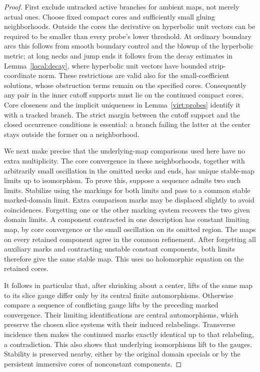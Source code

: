 \documentclass[11pt]{article}
\theoremstyle{definition}
\theoremstyle{remark}
\numberwithin{equation}{section}
\begin{document}
\begin{proof}
First exclude untracked active branches for ambient maps, not merely
actual ones.  Choose fixed compact cores and sufficiently small gluing
neighborhoods.  Outside the cores the derivative on hyperbolic unit
vectors can be required to be smaller than every probe's lower
threshold.  At ordinary boundary arcs this follows from smooth boundary
control and the blowup of the hyperbolic metric; at long necks and jump
ends it follows from the decay estimates in Lemma~\ref{local:decay},
where hyperbolic unit vectors have bounded strip-coordinate norm.
These restrictions are valid also for the small-coefficient solutions,
whose obstruction terms remain on the specified cores.  Consequently
any pair in the inner cutoff supports must lie on the continued compact
cores.  Core closeness and the implicit uniqueness in
Lemma~\ref{virt:probes} identify it with a tracked branch.  The strict
margin between the cutoff support and the closed occurrence conditions
is essential: a branch failing the latter at the center stays outside
the former on a neighborhood.

We next make precise that the underlying-map comparisons used here have
no extra multiplicity.  The core convergence in these neighborhoods,
together with arbitrarily small oscillation in the omitted necks and
ends, has unique stable-map limits up to isomorphism.  To prove this,
suppose a sequence admits two such limits.  Stabilize using the markings
for both limits and pass to a common stable marked-domain limit.  Extra
comparison marks may be displaced slightly to avoid coincidences.
Forgetting one or the other marking system recovers the two given domain
limits.  A component contracted in one description has constant limiting
map, by core convergence or the small oscillation on its omitted region.
The maps on every retained component agree in the common refinement.
After forgetting all auxiliary marks and contracting unstable constant
components, both limits therefore give the same stable map.  This uses
no holomorphic equation on the retained cores.

It follows in particular that, after shrinking about a center, lifts of
the same map to its slice gauge differ only by its central finite
automorphisms.  Otherwise compare a sequence of conflicting gauge lifts
by the preceding marked convergence.  Their limiting identifications
are central automorphisms, which preserve the chosen slice systems with
their induced relabelings.  Transverse incidence then makes the continued
marks exactly identical up to that relabeling, a contradiction.  This
also shows that underlying isomorphisms lift to the gauges.  Stability is
preserved nearby, either by the original domain specials or by the
persistent immersive cores of nonconstant components.


\end{proof}
\end{document}
